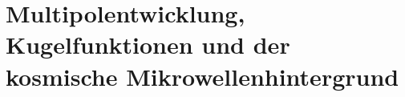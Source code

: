 %
%
%
\chapter{Multipolentwicklung, Kugelfunktionen und der
kosmische Mikrowellenhintergrund
\label{skript:chapter:multipol}}
\rhead{}

